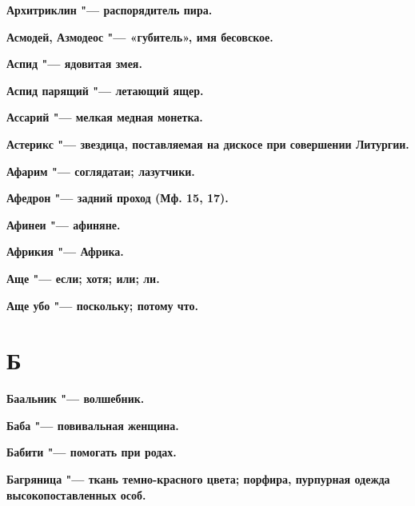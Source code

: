 \begin{mymulticols}{2}
\bfseries Архитриклин\normalfont{} "--- распорядитель пира. 




\bfseries Асмодей, Азмодеос\normalfont{} "--- «губитель», имя бесовское. 




\bfseries Аспид\normalfont{} "--- ядовитая змея. 




\bfseries Аспид парящий\normalfont{} "--- летающий ящер. 




\bfseries Ассарий\normalfont{} "--- мелкая медная монетка. 




\bfseries Астерикс\normalfont{} "--- звездица, поставляемая на дискосе при совершении Литургии. 




\bfseries Афарим\normalfont{} "--- соглядатаи; лазутчики. 




\bfseries Афедрон\normalfont{} "--- задний проход (Мф. 15, 17). 




\bfseries Афинеи\normalfont{} "--- афиняне. 




\bfseries Африкия\normalfont{} "--- Африка. 




\bfseries Аще\normalfont{} "--- если; хотя; или; ли. 




\bfseries Аще убо\normalfont{} "--- поскольку; потому что. 




\section{Б} 





\bfseries Баальник\normalfont{} "--- волшебник. 




\bfseries Баба\normalfont{} "--- повивальная женщина. 




\bfseries Бабити\normalfont{} "--- помогать при родах. 




\bfseries Багряница\normalfont{} "--- ткань темно-красного цвета; порфира, пурпурная одежда высокопоставленных особ. 





\end{mymulticols}
